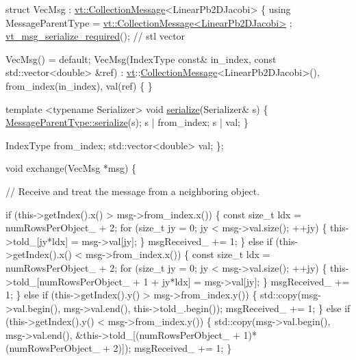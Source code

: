 \begin{DoxyCodeInclude}
  \textcolor{keyword}{struct }VecMsg : \hyperlink{structvt_1_1vrt_1_1collection_1_1_collection_message}{vt::CollectionMessage}<LinearPb2DJacobi> \{
    \textcolor{keyword}{using} MessageParentType = \hyperlink{structvt_1_1vrt_1_1collection_1_1_collection_message}{vt::CollectionMessage<LinearPb2DJacobi>}
      ;
    \hyperlink{message__serialize_8h_a54128d5338aaa9c918179826085e13d1}{vt\_msg\_serialize\_required}(); \textcolor{comment}{// stl vector}

    VecMsg() = \textcolor{keywordflow}{default};
    VecMsg(IndexType \textcolor{keyword}{const}& in\_index, \textcolor{keyword}{const} std::vector<double> &ref) :
      \hyperlink{namespacevt}{vt}::\hyperlink{namespacevt_ae7700e12f79c0fec16964aab84838428}{CollectionMessage}<LinearPb2DJacobi>(),
      from\_index(in\_index), val(ref)
    \{ \}

    \textcolor{keyword}{template} <\textcolor{keyword}{typename} Serializer>
    \textcolor{keywordtype}{void} \hyperlink{namespacecheckpoint_a075da4e7344cf037943362517e606c3a}{serialize}(Serializer& s) \{
      \hyperlink{namespacecheckpoint_a075da4e7344cf037943362517e606c3a}{MessageParentType::serialize}(s);
      s | from\_index;
      s | val;
    \}

    IndexType from\_index;
    std::vector<double> val;
  \};

  \textcolor{keywordtype}{void} exchange(VecMsg *msg) \{

    \textcolor{comment}{// Receive and treat the message from a neighboring object.}

    \textcolor{keywordflow}{if} (this->getIndex().x() > msg->from\_index.x()) \{
      \textcolor{keyword}{const} \textcolor{keywordtype}{size\_t} ldx = numRowsPerObject\_ + 2;
      \textcolor{keywordflow}{for} (\textcolor{keywordtype}{size\_t} jy = 0; jy < msg->val.size(); ++jy) \{
        this->told\_[jy*ldx] = msg->val[jy];
      \}
      msgReceived\_ += 1;
    \}
    \textcolor{keywordflow}{else} \textcolor{keywordflow}{if} (this->getIndex().x() < msg->from\_index.x()) \{
      \textcolor{keyword}{const} \textcolor{keywordtype}{size\_t} ldx = numRowsPerObject\_ + 2;
      \textcolor{keywordflow}{for} (\textcolor{keywordtype}{size\_t} jy = 0; jy < msg->val.size(); ++jy) \{
        this->told\_[numRowsPerObject\_ + 1 + jy*ldx] = msg->val[jy];
      \}
      msgReceived\_ += 1;
    \}
    \textcolor{keywordflow}{else} \textcolor{keywordflow}{if} (this->getIndex().y() > msg->from\_index.y()) \{
      std::copy(msg->val.begin(), msg->val.end(), this->told\_.begin());
      msgReceived\_ += 1;
    \}
    \textcolor{keywordflow}{else} \textcolor{keywordflow}{if} (this->getIndex().y() < msg->from\_index.y()) \{
      std::copy(msg->val.begin(), msg->val.end(),
                &this->told\_[(numRowsPerObject\_ + 1)*(numRowsPerObject\_ + 2)]);
      msgReceived\_ += 1;
    \}


\end{DoxyCodeInclude}

